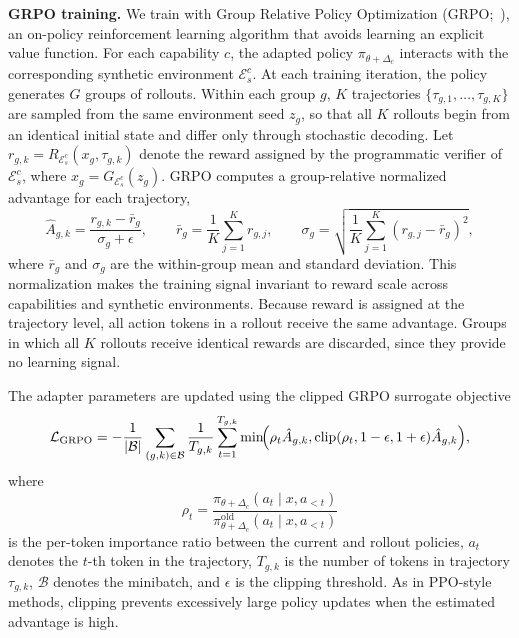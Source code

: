 \noindent\textbf{GRPO training.} We train with Group Relative Policy Optimization (GRPO;~\citealt{shao2024deepseekmath}), an on-policy reinforcement learning algorithm that avoids learning an explicit value function. For each capability $c$, the adapted policy $\pi_{\theta+\Delta_c}$ interacts with the corresponding synthetic environment $\mathcal{E}_s^c$. At each training iteration, the policy generates $G$ groups of rollouts. Within each group $g$, $K$ trajectories $\{\tau_{g,1}, \dots, \tau_{g,K}\}$ are sampled from the same environment seed $z_g$, so that all $K$ rollouts begin from an identical initial state and differ only through stochastic decoding. Let $r_{g,k} = R_{\mathcal{E}_s^c}(x_g, \tau_{g,k})$ denote the reward assigned by the programmatic verifier of $\mathcal{E}_s^c$, where $x_g = G_{\mathcal{E}_s^c}(z_g)$. GRPO computes a group-relative normalized advantage for each trajectory,
\begin{equation}
\hat{A}_{g,k} = \frac{r_{g,k} - \bar{r}_g}{\sigma_g + \epsilon},
\qquad
\bar{r}_g = \frac{1}{K}\sum_{j=1}^{K} r_{g,j},
\qquad
\sigma_g = \sqrt{\frac{1}{K}\sum_{j=1}^{K}(r_{g,j}-\bar{r}_g)^2},
\end{equation}
where $\bar{r}_g$ and $\sigma_g$ are the within-group mean and standard deviation. This normalization makes the training signal invariant to reward scale across capabilities and synthetic environments. Because reward is assigned at the trajectory level, all action tokens in a rollout receive the same advantage. Groups in which all $K$ rollouts receive identical rewards are discarded, since they provide no learning signal.

The adapter parameters are updated using the clipped GRPO surrogate objective
\begin{equation}
\mathcal{L}_{\mathrm{GRPO}}
=
-\frac{1}{|\mathcal{B}|}
\sum_{(g,k)\in\mathcal{B}}
\frac{1}{T_{g,k}}
\sum_{t=1}^{T_{g,k}}
\min\!\Bigl(
\rho_t \hat{A}_{g,k},
\mathrm{clip}(\rho_t, 1-\epsilon, 1+\epsilon)\hat{A}_{g,k}
\Bigr),
\label{eq:grpo}
\end{equation}
where
\[
\rho_t
=
\frac{\pi_{\theta+\Delta_c}(a_t \mid x, a_{<t})}
{\pi_{\theta+\Delta_c}^{\mathrm{old}}(a_t \mid x, a_{<t})}
\]
is the per-token importance ratio between the current and rollout policies, $a_t$ denotes the $t$-th token in the trajectory, $T_{g,k}$ is the number of tokens in trajectory $\tau_{g,k}$, $\mathcal{B}$ denotes the minibatch, and $\epsilon$ is the clipping threshold. As in PPO-style methods, clipping prevents excessively large policy updates when the estimated advantage is high.

